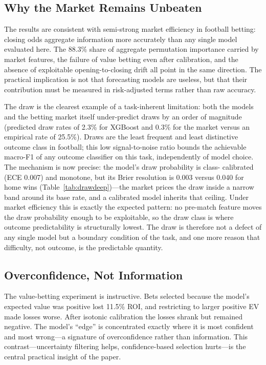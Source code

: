 \label{sec:discussion}

\subsection{Why the Market Remains Unbeaten}
The results are consistent with semi-strong market efficiency in
football betting: closing odds aggregate information more accurately
than any single model evaluated here. The 88.3\% share of aggregate
permutation importance carried by market features, the failure of value betting
even after calibration, and the absence of exploitable
opening-to-closing drift all point in the same direction. The
practical implication is not that forecasting models are useless,
but that their contribution must be measured in risk-adjusted terms
rather than raw accuracy.

The draw is the clearest example of a task-inherent limitation:
both the models and the betting market itself under-predict draws by
an order of magnitude (predicted draw rates of 2.3\% for XGBoost and
0.3\% for the market versus an empirical rate of 25.5\%). Draws are
the least frequent and least distinctive outcome class in football;
this low signal-to-noise ratio bounds the achievable macro-F1 of any
outcome classifier on this task, independently of model choice. The
mechanism is now precise: the model's draw probability is class-
calibrated (ECE 0.007) and monotone, but its Brier resolution is
0.003 versus 0.040 for home wins (Table~\ref{tab:drawdeep})---the
market prices the draw inside a narrow band around its base rate,
and a calibrated model inherits that ceiling. Under market
efficiency this is exactly the expected pattern: no pre-match
feature moves the draw probability enough to be exploitable, so the
draw class is where outcome predictability is structurally lowest.
The draw is therefore not a defect of any single model but a
boundary condition of the task, and one more reason that difficulty,
not outcome, is the predictable quantity.

\subsection{Overconfidence, Not Information}
The value-betting experiment is instructive. Bets selected because
the model's expected value was positive lost 11.5\% ROI, and
restricting to larger positive EV made losses worse. After isotonic
calibration the losses shrank but remained negative. The model's
``edge'' is concentrated exactly where it is most confident and most
wrong---a signature of overconfidence rather than information. This
contrast---uncertainty filtering helps, confidence-based selection
hurts---is the central practical insight of the paper.

